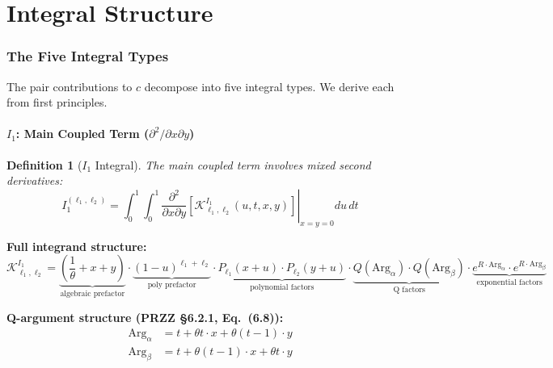\documentclass[11pt]{article}
\newtheorem{definition}{Definition}
\begin{document}

\part{Integral Structure}

\section{The Five Integral Types}
\label{sec:integrals}

The pair contributions to $c$ decompose into five integral types. We derive each from first principles.

\subsection{$I_1$: Main Coupled Term ($\partial^2/\partial x \partial y$)}

\begin{definition}[$I_1$ Integral]
The main coupled term involves mixed second derivatives:
\begin{equation}
\boxed{
I_1^{(\ell_1,\ell_2)} = \int_0^1 \int_0^1 \left.\frac{\partial^2}{\partial x \partial y}\left[\mathcal{K}^{I_1}_{\ell_1,\ell_2}(u,t,x,y)\right]\right|_{x=y=0} du\, dt
}
\end{equation}
\end{definition}

\textbf{Full integrand structure:}
\begin{equation}
\mathcal{K}^{I_1}_{\ell_1,\ell_2} = \underbrace{\left(\frac{1}{\theta} + x + y\right)}_{\text{algebraic prefactor}} \cdot \underbrace{(1-u)^{\ell_1+\ell_2}}_{\text{poly prefactor}} \cdot \underbrace{P_{\ell_1}(x+u) \cdot P_{\ell_2}(y+u)}_{\text{polynomial factors}} \cdot \underbrace{Q(\text{Arg}_\alpha) \cdot Q(\text{Arg}_\beta)}_{\text{Q factors}} \cdot \underbrace{e^{R \cdot \text{Arg}_\alpha} \cdot e^{R \cdot \text{Arg}_\beta}}_{\text{exponential factors}}
\end{equation}

\textbf{Q-argument structure (PRZZ \S6.2.1, Eq.~(6.8)):}
\begin{align}
\text{Arg}_\alpha &= t + \theta t \cdot x + \theta(t-1) \cdot y \\
\text{Arg}_\beta &= t + \theta(t-1) \cdot x + \theta t \cdot y
\end{align}
\end{document}
